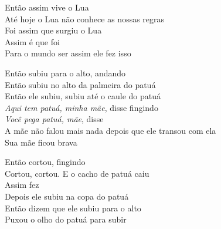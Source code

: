 \smallskip
\begin{center}\end{center}
\smallskip

\noindent Então assim vive o Lua\\
Até hoje o Lua não conhece as nossas regras\\
Foi assim que surgiu o Lua\\
Assim é que foi\\
Para o mundo ser assim ele fez isso

\smallskip
\begin{center}\end{center}
\smallskip

\noindent Então subiu para o alto, andando\\
Então subiu no alto da palmeira do patuá\\
Então ele subiu, subiu até o caule do patuá\\
\textit{Aqui tem patuá, minha mãe}, disse fingindo\\
\textit{Você pega patuá, mãe}, disse\\
A mãe não falou mais nada depois que ele transou com ela\\
Sua mãe ficou brava

\smallskip
\begin{center}\end{center}
\smallskip

\noindent Então cortou, fingindo\\
Cortou, cortou. E o cacho de patuá caiu\\
Assim fez\\
Depois ele subiu na copa do patuá\\
Então dizem que ele subiu para o alto\\
Puxou o olho do patuá para subir

